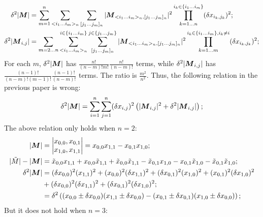 \documentclass[twoside]{article}
\numberwithin{equation}{section}
\begin{document}
\begin{align*}
\delta^2 |\protect{\textrm{\boldmath $M$}}| &= \sum_{m=1}^{n} \sum_{<i_1 \dots i_m>_n} \sum_{[j_1 \dots j_m]_n}
  		|\protect{\textrm{\boldmath $M$}} _{<i_1 \dots i_m>_n, [j_1 \dots j_m]_n}|^2  \prod_{k=1 \dots n}^{i_k \in \{i_1 \dots i_m\}} (\delta x_{i_k, j_k})^2; \\
\delta^2 |\protect{\textrm{\boldmath $M$}}_{i,j}| &= \sum_{m=2 \dots n} \sum_{<i_1 \dots i_m>_n}^{i \in \{i_1 \dots i_m\}} \sum_{[j_1 \dots j_m]_n}^{j \in \{j_1 \dots j_m\}}
  	|\protect{\textrm{\boldmath $M$}} _{<i_1 \dots i_m>_n, [j_1 \dots j_m]_n}|^2  \prod_{k=1 \dots m}^{i_k \in \{i_1 \dots i_m\}, i_k \ne i} (\delta x_{i_k, j_k})^2;
\end{align*}
For each $m$, $\delta^2 |\protect{\textrm{\boldmath $M$}}|$ has  $\frac{n!}{(n - m)! m!} \frac{n!}{(n - m)!}$ terms, while $\delta^2 |\protect{\textrm{\boldmath $M$}}_{i,j}|$ has $\frac{(n - 1)!}{(n - m)! (m - 1)!} \frac{(n - 1)!}{(n - m)!}$ terms.  The ratio is $\frac{m^2}{n^2}$.
Thus, the following relation in the previous paper is wrong:
\begin{equation*}
\delta^2 |\protect{\textrm{\boldmath $M$}}| = \sum_{i=1}^{n} \sum_{j=1}^{n} (\delta x_{i, j})^2 \left(|\protect{\textrm{\boldmath $M$}}_{i, j}|^2 + \delta^2 |\protect{\textrm{\boldmath $M$}}_{i,j}| \right);
\end{equation*}
The above relation only holds when $n=2$:
\begin{align*}
|\protect{\textrm{\boldmath $M$}}| &= \left| \begin{matrix} x_{0,0}, x_{0,1} \\ x_{1,0}, x_{1,1} \end{matrix} \right| = x_{0,0} x_{1,1} - x_{0,1} x_{1,0};  \\
|\tilde{M}| - |\protect{\textrm{\boldmath $M$}}| &= \tilde{x}_{0,0} x_{1,1} + x_{0,0} \tilde{x}_{1,1} + \tilde{x}_{0,0} \tilde{x}_{1,1}
	 - \tilde{x}_{0,1} x_{1,0} - x_{0,1} \tilde{x}_{1,0} - \tilde{x}_{0,1} \tilde{x}_{1,0}; \\
\delta^2 |\protect{\textrm{\boldmath $M$}}| &= (\delta x_{0,0})^2 (x_{1,1})^2 + (x_{0,0})^2 (\delta x_{1,1})^2 +  (\delta x_{0,1})^2 (x_{1,0})^2 + (x_{0,1})^2 (\delta x_{1,0})^2 \\
		&+ (\delta x_{0,0})^2 (\delta x_{1,1})^2 + (\delta x_{0,1})^2 (\delta x_{1,0})^2; \\
	&= \delta^2 \left( (x_{0,0} \pm \delta x_{0,0}) (x_{1,1} \pm \delta x_{0,0}) -  (x_{0,1} \pm \delta x_{0,1}) (x_{1,0} \pm \delta x_{0,0}) \right);
\end{align*}
But it does not hold when $n=3$:
\end{document}

